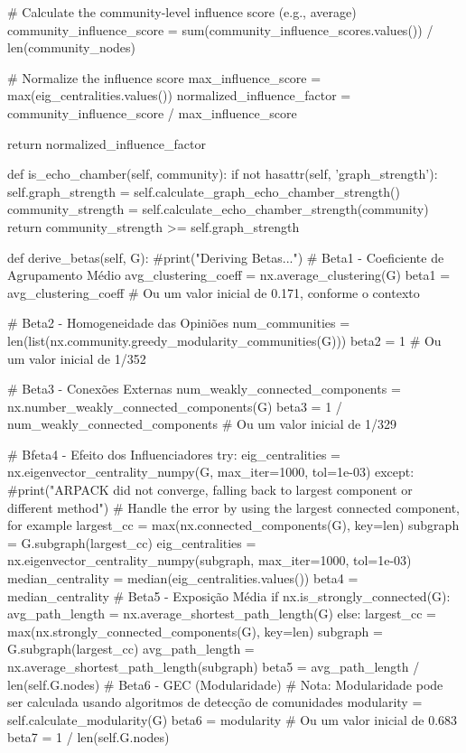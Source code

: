 \begin{codigo}[caption={Exemplo de classe Python para deteção de câmaras de eco}, label={codigo:echochamberdetector}, language=Python, breaklines=true]
        # Calculate the community-level influence score (e.g., average)
        community_influence_score = sum(community_influence_scores.values()) / len(community_nodes)

        # Normalize the influence score
        max_influence_score = max(eig_centralities.values())
        normalized_influence_factor = community_influence_score / max_influence_score

        return normalized_influence_factor

    def is_echo_chamber(self, community):
        if not hasattr(self, 'graph_strength'):
          self.graph_strength = self.calculate_graph_echo_chamber_strength()
        community_strength = self.calculate_echo_chamber_strength(community)
        return community_strength >= self.graph_strength

    def derive_betas(self, G):
        #print("Deriving Betas...")
        # Beta1 - Coeficiente de Agrupamento Médio
        avg_clustering_coeff = nx.average_clustering(G)
        beta1 = avg_clustering_coeff  # Ou um valor inicial de 0.171, conforme o contexto

        # Beta2 - Homogeneidade das Opiniões
        num_communities = len(list(nx.community.greedy_modularity_communities(G)))
        beta2 = 1  # Ou um valor inicial de 1/352

        # Beta3 - Conexões Externas
        num_weakly_connected_components = nx.number_weakly_connected_components(G)
        beta3 = 1 / num_weakly_connected_components  # Ou um valor inicial de 1/329

        # Bfeta4 - Efeito dos Influenciadores
        try:
            eig_centralities = nx.eigenvector_centrality_numpy(G, max_iter=1000, tol=1e-03)
        except:
            #print("ARPACK did not converge, falling back to largest component or different method")
            # Handle the error by using the largest connected component, for example
            largest_cc = max(nx.connected_components(G), key=len)
            subgraph = G.subgraph(largest_cc)
            eig_centralities = nx.eigenvector_centrality_numpy(subgraph, max_iter=1000, tol=1e-03)
        median_centrality = median(eig_centralities.values())
        beta4 = median_centrality
        # Beta5 - Exposição Média
        if nx.is_strongly_connected(G):
            avg_path_length = nx.average_shortest_path_length(G)
        else:
            largest_cc = max(nx.strongly_connected_components(G), key=len)
            subgraph = G.subgraph(largest_cc)
            avg_path_length = nx.average_shortest_path_length(subgraph)
        beta5 = avg_path_length / len(self.G.nodes)
        # Beta6 - GEC (Modularidade)
        # Nota: Modularidade pode ser calculada usando algoritmos de detecção de comunidades
        modularity = self.calculate_modularity(G)
        beta6 = modularity  # Ou um valor inicial de 0.683
        beta7 = 1 / len(self.G.nodes)


\end{codigo}
